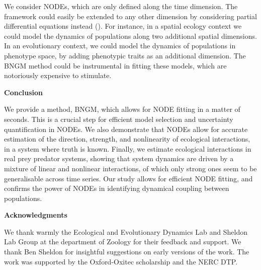 \documentclass[11pt, oneside]{article}
\begin{document}

We consider NODEs, which are only defined along the time dimension.
The framework could easily be extended to any other dimension by considering partial differential equations instead (\cite{Rackauckas2019}).
For instance, in a spatial ecology context we could model the dynamics of populations along two additional spatial dimensions.
In an evolutionary context, we could model the dynamics of populations in phenotype space, by adding phenotypic traits as an additional dimension.
The BNGM method could be instrumental in fitting these models, which are notoriously expensive to stimulate.

\textbf{Conclusion}

We provide a method, BNGM, which allows for NODE fitting in a matter of seconds.
This is a crucial step for efficient model selection and uncertainty quantification in NODEs.
We also demonstrate that NODEs allow for accurate estimation of the direction, strength, and nonlinearity of ecological interactions, in a system where truth is known.
Finally, we estimate ecological interactions in real prey predator systems, showing that system dynamics are driven by a mixture of linear and nonlinear interactions, of which only strong ones seem to be generalisable across time series.
Our study allows for efficient NODE fitting, and confirms the power of NODEs in identifying dynamical coupling between populations. 

\textbf{Acknowledgments}

We thank warmly the Ecological and Evolutionary Dynamics Lab and Sheldon Lab Group at the department of Zoology for their feedback and support.
We thank Ben Sheldon for insightful suggestions on early versions of the work.
The work was supported by the Oxford-Oxitec scholarship and the NERC DTP.
\end{document}
